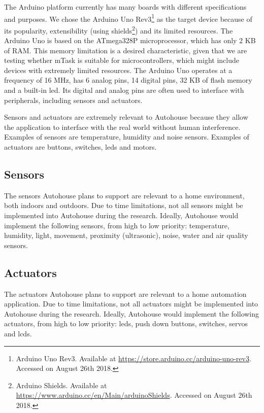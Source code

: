 The Arduino platform currently has many boards with different specifications and purposes. We chose the Arduino Uno Rev3\footnote{Arduino Uno Rev3. Available at \url{https://store.arduino.cc/arduino-uno-rev3}. Accessed on August 26th 2018.}  as the target device because of its popularity, extensibility (using shields\footnote{Arduino Shields. Available at \url{https://www.arduino.cc/en/Main/arduinoShields}. Accessed on August 26th 2018.}) and its limited resources. The Arduino Uno is based on the ATmega328P microprocessor, which has only 2 KB of RAM. This memory limitation is a desired characteristic, given that we are testing whether mTask is suitable for microcontrollers, which might include devices with extremely limited resources. The Arduino Uno operates at a frequency of 16 MHz, has 6 analog pins, 14 digital pins, 32 KB of flash memory and a built-in \acs{led}. Its digital and analog pins are often used to interface with peripherals, including sensors and actuators. 

Sensors and actuators are extremely relevant to Autohouse because they allow the application to interface with the real world without human interference. Examples of sensors are temperature, humidity and noise sensors. Examples of actuators are buttons, switches, \acsp{led} and motors.

\subsection{Sensors}

The sensors Autohouse plans to support are relevant to a home environment, both indoors and outdoors. Due to time limitations, not all sensors might be implemented into Autohouse during the research. Ideally, Autohouse would implement the following sensors, from high to low priority: temperature, humidity, light, movement, proximity (ultrasonic), noise, water and air quality sensors. 

\subsection{Actuators}

The actuators Autohouse plans to support are relevant to a home automation application. Due to time limitations, not all actuators might be implemented into Autohouse during the research. Ideally, Autohouse would implement the following actuators, from high to low priority: \acsp{led}, push down buttons, switches, servos and \acsp{lcd}.

